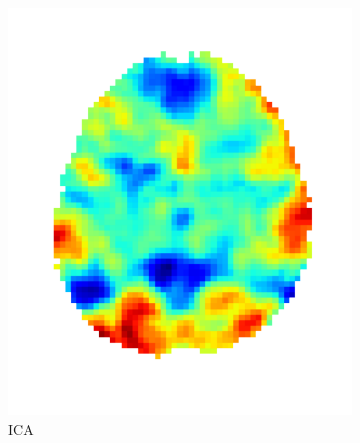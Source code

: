 \documentclass{article} %
\begin{document}
\begin{figure}
\begin{preview}
      \begin{subfigure}[b]{.3\linewidth}
        \includegraphics[width=\linewidth]{ica}%
	\vspace*{-1.8em}
        \caption*{\sffamily ICA}
      \end{subfigure}
      \begin{subfigure}[b]{.3\linewidth}

\end{subfigure}
\end{preview}
\end{figure}
\end{document}
